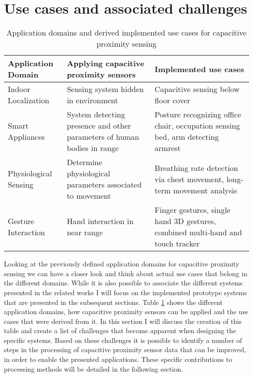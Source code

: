 \section{Use cases and associated challenges}
\begin{table}[htbp]
  \centering
  \caption{Application domains and derived implemented use cases for capacitive proximity sensing}
    \begin{tabularx}{0.8\linewidth}{p{4cm}XX}
    \toprule
    Application Domain & Applying capacitive proximity sensors & Implemented use cases \\
    \midrule
    Indoor Localization & Sensing system hidden in environment & Capacitive sensing below floor cover \\
    Smart Appliances & System detecting presence and other parameters of human bodies in range & Posture recognizing office chair, occupation sensing bed, arm detecting armrest \\
    Physiological Sensing & Determine physiological parameters associated to movement & Breathing rate detection via chest movement, long-term movement analysis \\
    Gesture Interaction & Hand interaction in near range & Finger gestures, single hand 3D gestures, combined multi-hand and touch tracker \\
    \bottomrule
    \end{tabularx}%
  \label{tab:usecase_list}%
\end{table}%

Looking at the previously defined application domains for capacitive proximity sensing we can have a closer look and think about actual use cases that belong in the different domains. While it is also possible to associate the different systems presented in the related works I will focus on the implemented prototype systems that are presented in the subsequent sections. Table \ref{tab:usecase_list} shows the different application domains, how capacitive proximity sensors can be applied and the use cases that were derived from it. In this section I will discuss the creation of this table and create a list of challenges that become apparent when designing the specific systems. Based on these challenges it is possible to identify a number of steps in the processing of capacitive proximity sensor data that can be improved, in order to enable the presented applications. These specific contributions to processing methods will be detailed in the following section.

